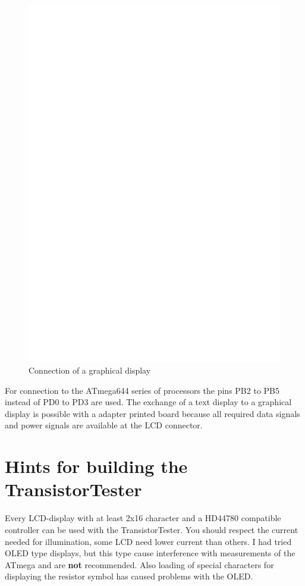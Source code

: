 \begin{figure}[H]
\centering
\includegraphics[width=14cm]{../FIG/ST7565lcd.eps}
\caption{Connection of a  graphical display}
\label{fig:ST7565lcd}
\end{figure}

For connection to the ATmega644 series of processors the pins PB2 to PB5 instead of PD0 to PD3 are used.
The exchange of a text display to a graphical display is possible with a adapter printed board because
all required data signals and power signals are available at the LCD connector.


\section{Hints for building the TransistorTester}
Every LCD-display with at least 2x16 character and a HD44780 compatible controller
can be used with the TransistorTester. You should respect the current needed for
illumination, some LCD need lower current than others.
I had tried OLED type displays, but this type cause interference with measurements
of the ATmega and are {\bf not} recommended. Also loading of special characters
for displaying the resistor symbol has caused problems with the OLED.

